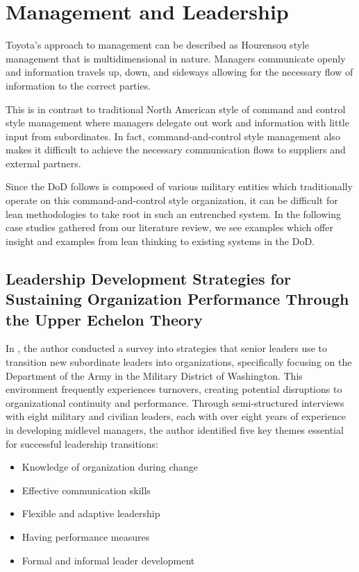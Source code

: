 \documentclass{article}
\begin{document}
	\section{Management and Leadership}

		Toyota's approach to management can be described as Hourensou style management that is multidimensional in nature.
		Managers communicate openly and information travels up, down, and sideways allowing for the necessary flow of information to the correct parties. 

		This is in contrast to traditional North American style of command and control style management where managers delegate out work and information with little input from subordinates.
		In fact, command-and-control style management also makes it difficult to achieve the necessary communication flows to suppliers and external partners.

		Since the DoD follows is composed of various military entities which traditionally operate on this command-and-control style organization, it can be difficult for lean methodologies to take root in such an entrenched system.
		In the following case studies gathered from our literature review, we see examples which offer insight and examples from lean thinking to existing systems in the DoD.


		\subsection{Leadership Development Strategies for Sustaining Organization Performance Through the Upper Echelon Theory \cite{McCants2024}}	

			In \cite{McCants2024}, the author conducted a survey into strategies that senior leaders use to transition new subordinate leaders into organizations, specifically focusing on the Department of the Army in the Military District of Washington. 
			This environment frequently experiences turnovers, creating potential disruptions to organizational continuity and performance.
			Through semi-structured interviews with eight military and civilian leaders, each with over eight years of experience in developing midlevel managers, the author identified five key themes essential for successful leadership transitions:

			\begin{itemize}
				\item Knowledge of organization during change
				\item Effective communication skills
				\item Flexible and adaptive leadership
				\item Having performance measures
				\item Formal and informal leader development
			\end{itemize}
\end{document}

